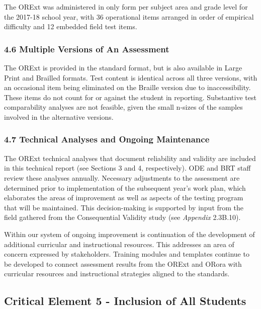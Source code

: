 \documentclass[]{article}
\begin{document}
The ORExt was administered in only form per subject area and grade level
for the 2017-18 school year, with 36 operational items arranged in order
of empirical difficulty and 12 embedded field test items.

\subsubsection{4.6 Multiple Versions of An
Assessment}\label{multiple-versions-of-an-assessment}

The ORExt is provided in the standard format, but is also available in
Large Print and Brailled formats. Test content is identical across all
three versions, with an occasional item being eliminated on the Braille
version due to inaccessibility. These items do not count for or against
the student in reporting. Substantive test comparability analyses are
not feasible, given the small n-sizes of the samples involved in the
alternative versions.

\subsubsection{4.7 Technical Analyses and Ongoing
Maintenance}\label{technical-analyses-and-ongoing-maintenance}

The ORExt technical analyses that document reliability and validity are
included in this technical report (see Sections 3 and 4, respectively).
ODE and BRT staff review these analyses annually. Necessary adjustments
to the assessment are determined prior to implementation of the
subsequent year's work plan, which elaborates the areas of improvement
as well as aspects of the testing program that will be maintained. This
decision-making is supported by input from the field gathered from the
Consequential Validity study (see \emph{Appendix} 2.3B.10).

Within our system of ongoing improvement is continuation of the
development of additional curricular and instructional resources. This
addresses an area of concern expressed by stakeholders. Training modules
and templates continue to be developed to connect assessment results
from the ORExt and ORora with curricular resources and instructional
strategies aligned to the standards.

\subsection{Critical Element 5 - Inclusion of All
Students}\label{critical-element-5---inclusion-of-all-students}
\end{document}
